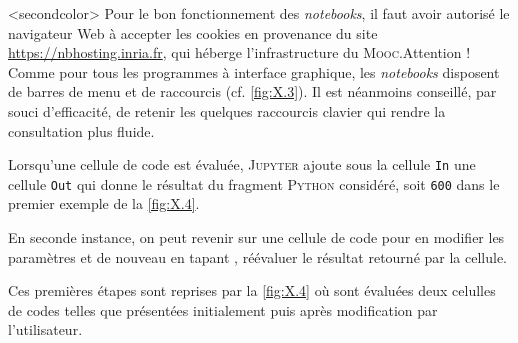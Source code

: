 \caution[t]<secondcolor>{%
Pour le bon fonctionnement des \textit{note\-books}, il faut avoir autorisé le navigateur Web à accepter les cookies en provenance du site \url{https://nbhosting.inria.fr}, qui héberge l'infrastructure du \textsc{Mooc}.}{Attention !}
Comme pour tous les programmes à interface graphique, les \textit{notebooks} disposent de barres de menu et de raccourcis (cf. \cref{fig:X.3}). Il est néanmoins conseillé, par souci d'efficacité, de retenir les quelques raccourcis clavier qui rendre la consultation plus fluide.

Lorsqu'une cellule de code est évaluée, \textsc{Jupyter} ajoute sous la cellule \texttt{In} une cellule \texttt{Out} qui donne le résultat du fragment \textsc{Python} considéré, soit \texttt{600} dans le premier exemple de la \cref{fig:X.4}.

%
En seconde instance, on peut revenir sur une cellule de code pour en modifier les paramètres et de nouveau en tapant , réévaluer le résultat retourné par la cellule.

Ces premières étapes sont reprises par la \cref{fig:X.4} où sont évaluées deux celulles de codes telles que présentées initialement puis après modification par l'utilisateur.


